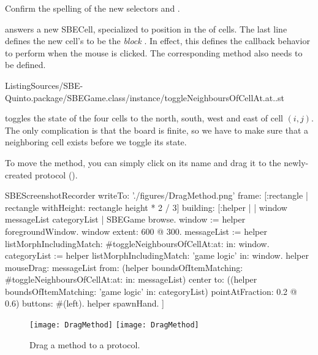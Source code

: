 \documentclass[a4paper,10pt,twoside]{book}
\begin{document}
Confirm the spelling of the new selectors  and .

 answers a new SBECell, specialized to position  in the  of cells.
The last line defines the new cell's  to be the \emph{block}
\mbox{.}
In effect, this defines the callback behavior to perform when the mouse is clicked.
The corresponding method also needs to be defined.

%
{ListingSources/SBE-Quinto.package/SBEGame.class/instance/toggleNeighboursOfCellAt.at..st}

 toggles the state of the four cells to the north, south, west and east of cell $(i, j)$.
The only complication is that the board is finite, so we have to make sure that a neighboring cell exists before we toggle its state.

To move the method, you can simply click on its name and drag it to the newly-created protocol ().

\begin{ExecuteSmalltalkScript}
SBEScreenshotRecorder writeTo: './figures/DragMethod.png' frame: [:rectangle | rectangle withHeight: rectangle height * 2 / 3] building: [:helper |
	| window messageList categoryList |
	SBEGame browse.
	window := helper foregroundWindow.
	window extent: 600 @ 300.
	messageList := helper listMorphIncludingMatch: #toggleNeighboursOfCellAt:at: in: window.
	categoryList := helper listMorphIncludingMatch: 'game logic' in: window.
	helper
		mouseDrag: messageList
		from: (helper boundsOfItemMatching: #toggleNeighboursOfCellAt:at: in: messageList) center
		to: ((helper boundsOfItemMatching: 'game logic' in: categoryList) pointAtFraction: 0.2 @ 0.6)
		buttons: #(left).
	helper spawnHand.
]
\end{ExecuteSmalltalkScript}
\begin{figure}[htbp]
   \centering
   \ifluluelse
		{\texttt{[image: DragMethod]} }
		{\texttt{[image: DragMethod]} }
   \caption{Drag a method to a protocol.\label{fig:dragMethod}}
\end{figure}
\end{document}
